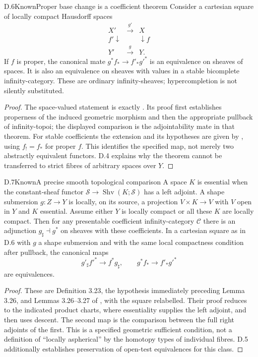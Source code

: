 \begin{claim}{D.6}{Known}{Proper base change is a coefficient theorem}
Consider a cartesian square of locally compact Hausdorff spaces
\[
\begin{array}{ccc}
 X'&\xrightarrow{g'}&X\\[-2pt]
 {\scriptstyle f'}\downarrow&&\downarrow{\scriptstyle f}\\[-2pt]
 Y'&\xrightarrow{g}&Y.
\end{array}
\]
If $f$ is proper, the canonical mate
$g^*f_*\to f'_*g'^*$ is an equivalence on sheaves of spaces.
It is also an equivalence on sheaves with values in a stable
bicomplete infinity-category. These are ordinary infinity-sheaves;
hypercompletion is not silently substituted.
\end{claim}
\begin{proof}
The space-valued statement is exactly
\citet[Corollary 7.3.1.18]{DGLurieHTT}. Its proof first establishes
properness of the induced geometric morphism and then the appropriate
pullback of infinity-topoi; the displayed comparison is the
adjointability mate in that theorem. For stable coefficients the
extension and its hypotheses are given by
\citet[Section 6.1 and Proposition 6.9]{DGVolpe2025}, using $f_!=f_*$
for proper $f$. This identifies the specified map, not merely two
abstractly equivalent functors. D.4 explains why the theorem cannot
be transferred to strict fibres of arbitrary spaces over $Y$.
\end{proof}

\begin{claim}{D.7}{Known}{A precise smooth topological comparison}
A space $K$ is essential when the constant-sheaf functor
$\mathcal S\to\operatorname{Shv}(K;\mathcal S)$ has a left adjoint.
A shape submersion $g:Z\to Y$ is locally, on its source, a projection
$V\times K\to V$ with $V$ open in $Y$ and $K$ essential.
Assume either $Y$ is locally compact or all these $K$ are locally
compact. Then for any presentable coefficient infinity-category
$\mathcal C$ there is an adjunction
$g_\sharp\dashv g^*$ on sheaves with these coefficients. In a
cartesian square as in D.6 with $g$ a shape submersion and with the
same local compactness condition after pullback, the canonical maps
\[
 g'_\sharp f'^*\longrightarrow f^*g_\sharp,
 \qquad g^*f_*\longrightarrow f'_*g'^*
\]
are equivalences.
\end{claim}
\begin{proof}
These are Definition 3.23, the hypothesis immediately preceding
Lemma 3.26, and Lemmas 3.26--3.27 of \citet{DGVolpe2025}, with the
square relabelled. Their proof reduces to the indicated product
charts, where essentiality supplies the left adjoint, and then uses
descent. The second map is the comparison between the full right
adjoints of the first. This is a specified geometric sufficient
condition, not a definition of ``locally aspherical'' by the
homotopy types of individual fibres. D.5 additionally establishes
preservation of open-test equivalences for this class.
\end{proof}

